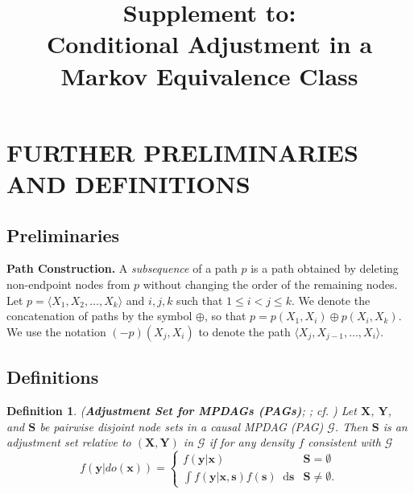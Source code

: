 \documentclass[twoside]{article}
\newtheorem{definition}[theorem]{Definition}
\newcommand{\mb}[1]{\mathbf{#1}}
\newcommand{\g}[1][G]{\mathcal{#1}}
\newcommand*\diff{\mathop{}\!\mathrm{d}}
\begin{document}
\title{Supplement to:\\ Conditional Adjustment in a Markov Equivalence Class}
\date{}
\maketitle








\section{FURTHER PRELIMINARIES AND DEFINITIONS}
\label{supp:defs}


\subsection{Preliminaries}
\textbf{Path Construction.}
A \textit{subsequence} of a path $p$ is a path obtained by deleting non-endpoint nodes from $p$ without changing the order of the remaining nodes. Let $p = \langle X_1, X_2, \dots, X_k \rangle$ and $i,j,k$ such that $1 \le i < j \le k$. We denote the concatenation of paths by the symbol $\oplus$, so that $p = p(X_1, X_i) \oplus p(X_i, X_k)$. We use the notation $(-p)(X_j,X_i)$ to denote the path $\langle X_j, X_{j-1}, \dots, X_i \rangle$.









\subsection{Definitions}

\begin{definition}
\label{def:as}
{\normalfont (\textbf{Adjustment Set for MPDAGs (PAGs)}; \citealp{perkovic2017interpreting, perkovic2018complete, perkovic2015complete}; cf. \citealp{maathuis2015generalized})}
    Let $\mb{X}$, $\mb{Y}$, and $\mb{S}$ be pairwise disjoint node sets in a causal MPDAG (PAG) $\g$. Then $\mb{S}$ is an adjustment set relative to $(\mb{X},\mb{Y})$ in $\g$ if for any density $f$ consistent with $\g$
    \[ f(\mb{y}|do(\mb{x}))  = 
    \begin{cases} 
          f(\mb{y} | \mb{x}) & \mb{S}=\emptyset \\
          \int f(\mb{y} | \mb{x}, \mb{s}) f(\mb{s}) \diff \mb{s}  & \mb{S}\neq\emptyset.
    \end{cases}
    \]
\end{definition}
\end{document}
